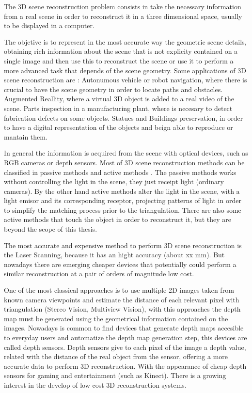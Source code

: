 
The 3D scene reconstruction problem consists in take the
necessary information from a real scene in order to reconstruct
it in a three dimensional space, usually to be displayed 
in a computer. 

The objetive is to represent in the most accurate way the geometric scene details, obtaining rich 
information about the scene that is not explicity contained on a single image and then use this 
to reconstruct the scene or use it to perform a more advanced task that depends of the scene geometry. 
Some applications of 3D scene reconstruction are : Autonumous vehicle or robot navigation, where there is crucial to have 
the scene geometry in order to locate paths and obstacles. Augmented Reallity, where a virtual 3D object
 is added to a real video of the scene. Parts inspection in a manufacturing plant, where is necesary to detect
 fabrication defects on some objects. Statues and Buildings preservation, in order to have a digital representation 
of the objects and beign able to reproduce or mantain them.

 
In general the information is acquired
 from the scene with optical devices, such as RGB cameras or depth sensors.
Most of 3D scene reconstruction methods can be classified in passive methods and active methods \cite{lanman}.
The passive methods works without controlling the light in the scene, they just receipt light (ordinary cameras). 
By the other hand active methods alter the light in the scene, with a light emisor and its corresponding 
receptor, projecting patterns of light in order to simplify the matching process prior to the triangulation. 
There are also some active methods that touch the object in order to reconstruct it, but they are beyond 
the scope of this thesis. 

The most accurate and expensive method to perform 3D scene reconstruction is the Laser Scanning, because it has 
an hight accuracy (about xx mm). But nowadays there are emerging cheaper devices that potentially could perform 
a similar reconstruction at a pair of orders of magnitude low cost. 

One of the most classical approaches is to use multiple 2D
 images taken from known camera viewpoints and estimate the distance of each
 relevant pixel with triangulation (Stereo Vision, Multiview Vision), with this 
approaches the depth map must be generated using the geometrical information contained
 on the images. Nowadays is common to find devices that generate depth maps accesible
 to everyday users and automatize the depth map generation step, this devices are called depth sensors. 
Depth sensors give to each pixel of the image a depth value, related
with the distance of the real object from the sensor, offering a more
accurate data to perform 3D reconstruction. With the appearance
of cheap depth sensors for gaming and entertainment (such as
Kinect). There is a growing interest in the develop of low cost
3D reconstruction systems. 


